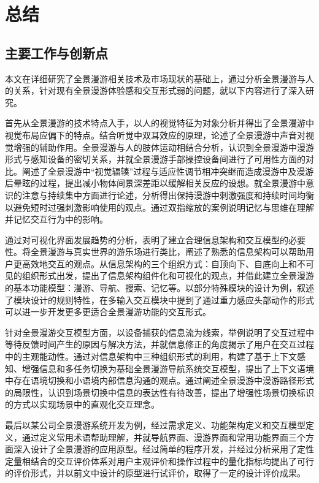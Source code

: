 \chapter{总结}

\section{主要工作与创新点}
本文在详细研究了全景漫游相关技术及市场现状的基础上，通过分析全景漫游与人的关系，针对现有全景漫游体验感和交互形式弱的问题，就以下内容进行了深入研究。

首先从全景漫游的技术特点入手，以人的视觉特征为对象分析并得出了全景漫游中视觉布局应偏下的特点。结合听觉中双耳效应的原理，论述了全景漫游中声音对视觉增强的辅助作用。全景漫游与人的肢体运动相结合分析，认识到全景漫游中漫游形式与感知设备的密切关系，并就全景漫游手部操控设备间进行了可用性方面的对比。阐述了全景漫游中“视觉辐辏”过程与适应性调节相冲突继而造成漫游中及漫游后晕眩的过程，提出减小物体间景深差距以缓解相关反应的设想。就全景漫游中意识的注意与持续集中方面进行论述，分析得出保持漫游中刺激强度和持续时间均衡以避免短时过强刺激影响使用的观点。通过双指缩放的案例说明记忆与思维在理解并记忆交互行为中的影响。

通过对可视化界面发展趋势的分析，表明了建立合理信息架构和交互模型的必要性。将全景漫游与真实世界的游乐场进行类比，阐述了熟悉的信息架构可以帮助用户更高效地交互的观点。从信息架构的三个组织方式：自顶向下、自底向上和不可见的组织形式出发，提出了信息架构组件化和可视化的观点，并借此建立全景漫游的基本功能模型：漫游、导航、搜索、记忆等。以部分特殊模块的设计为例，叙述了模块设计的规则特性，在多输入交互模块中提到了通过重力感应头部动作的形式可以进一步开发更多更适合全景漫游功能的交互形式。

针对全景漫游交互模型方面，以设备捕获的信息流为线索，举例说明了交互过程中等待反馈时间产生的原因与解决方法，并就信息修正的角度揭示了用户在交互过程中的主观能动性。通过对信息架构中三种组织形式的利用，构建了基于上下文感知、增强信息和多任务切换为基础全景漫游导航系统交互模型，提出了上下文语境中存在语境切换和小语境内部信息沟通的观点。通过阐述全景漫游中漫游路径形式的局限性，认识到场景切换中信息的表达性有待改善，提出了增强性场景切换标识的方式以实现场景中的直观化交互理念。

最后以某公司全景漫游系统开发为例，经过需求定义、功能架构定义和交互模型定义，通过定义常用术语帮助理解，并就导航界面、漫游界面和常用功能界面三个方面深入设计了全景漫游的应用原型。经过简单的程序开发，并经过分析采用了定性定量相结合的交互评价体系对用户主观评价和操作过程中的量化指标均提出了可行的评价形式，并以前文中设计的原型进行试评价，取得了一定的设计评价成果。

